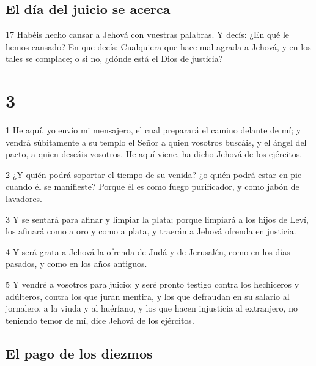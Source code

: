\section*{El día del juicio se acerca}

\par 17 Habéis hecho cansar a Jehová con vuestras palabras. Y decís: ¿En qué le hemos cansado? En que decís: Cualquiera que hace mal agrada a Jehová, y en los tales se complace; o si no, ¿dónde está el Dios de justicia?

\chapter{3}

\par 1 He aquí, yo envío mi mensajero, el cual preparará el camino delante de mí; y vendrá súbitamente a su templo el Señor a quien vosotros buscáis, y el ángel del pacto, a quien deseáis vosotros. He aquí viene, ha dicho Jehová de los ejércitos.
\par 2 ¿Y quién podrá soportar el tiempo de su venida? ¿o quién podrá estar en pie cuando él se manifieste? Porque él es como fuego purificador, y como jabón de lavadores.
\par 3 Y se sentará para afinar y limpiar la plata; porque limpiará a los hijos de Leví, los afinará como a oro y como a plata, y traerán a Jehová ofrenda en justicia.
\par 4 Y será grata a Jehová la ofrenda de Judá y de Jerusalén, como en los días pasados, y como en los años antiguos.
\par 5 Y vendré a vosotros para juicio; y seré pronto testigo contra los hechiceros y adúlteros, contra los que juran mentira, y los que defraudan en su salario al jornalero, a la viuda y al huérfano, y los que hacen injusticia al extranjero, no teniendo temor de mí, dice Jehová de los ejércitos.

\section*{El pago de los diezmos}

